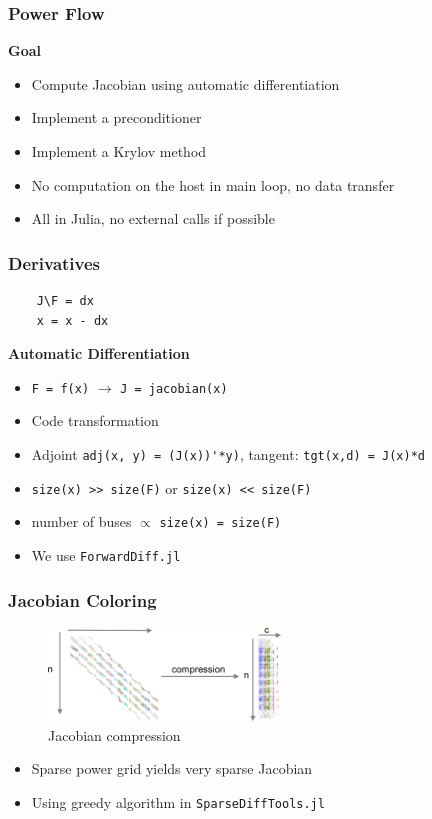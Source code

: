 \begin{frame}
  \frametitle{Power Flow}
  {\bf Goal}
  \begin{itemize}
    \item Compute Jacobian using automatic differentiation
    \item Implement a preconditioner
    \item Implement a Krylov method
    \item No computation on the host in main loop, no data transfer
    \item All in Julia, no external calls if possible
  \end{itemize}
\end{frame}

\begin{frame}[fragile]
  \frametitle{Derivatives}
  \begin{center}
  \lstset{linewidth = 0.25\textwidth, frame=tb}
    \begin{lstlisting}
    J\F = dx
    x = x - dx
    \end{lstlisting}
  \end{center}
  \lstset{linewidth = \textwidth}
  {\bf Automatic Differentiation}
  \begin{itemize}
    \item \lstinline{F = f(x)} $\rightarrow$ \lstinline{J = jacobian(x)}
    \item Code transformation
    \item Adjoint \lstinline{adj(x, y) = (J(x))'*y)}, tangent: \lstinline{tgt(x,d) = J(x)*d} 
    \item \lstinline{size(x) >> size(F)} or \lstinline{size(x) << size(F)}
    \item number of buses $\propto$ \lstinline{size(x) = size(F)}
    \item We use \lstinline{ForwardDiff.jl}
  \end{itemize}
\end{frame}

\begin{frame}
  \frametitle{Jacobian Coloring}
  \begin{center}
    \begin{figure}
      \includegraphics[width=0.55\textwidth]{figures/compression}
      \caption{Jacobian compression}
    \end{figure}
  \end{center}
  \begin{itemize}
    \item Sparse power grid yields very sparse Jacobian
    \item Using greedy algorithm in \lstinline{SparseDiffTools.jl}
  \end{itemize}
\end{frame}

